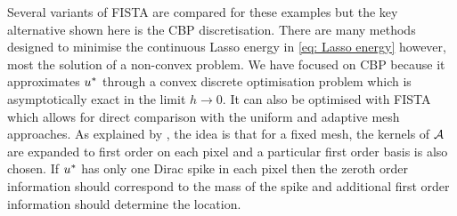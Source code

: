 \documentclass[10pt,a4paper,onecolumn]{article}
\numberwithin{equation}{section}
\newcommand*{\varf}[1]{%
	\IfEqCase{#1}{%
		{0}{u}%
		{1}{v}%
		{2}{w}%
	}[u#1]%
}
\newcommand{\meshsize}{h}
\begin{document}
Several variants of FISTA are compared for these examples but the key alternative shown here is the CBP discretisation. There are many methods designed to minimise the continuous Lasso energy in \eqref{eq: Lasso energy} \citep[c.f.][]{Bredies2013,Castro2016,Boyd2017,Catala2019} however, most the solution of a non-convex problem. We have focused on CBP because it approximates $\varf0^*$ through a convex discrete optimisation problem which is asymptotically exact in the limit $\meshsize\to0$. It can also be optimised with FISTA which allows for direct comparison with the uniform and adaptive mesh approaches. As explained by \citet{Ekanadham2011, Duval2017b}, the idea is that for a fixed mesh, the kernels of $\mathcal{A}$ are expanded to first order on each pixel and a particular first order basis is also chosen. If $\varf0^*$ has only one Dirac spike in each pixel then the zeroth order information should correspond to the mass of the spike and additional first order information should determine the location.
\end{document}
